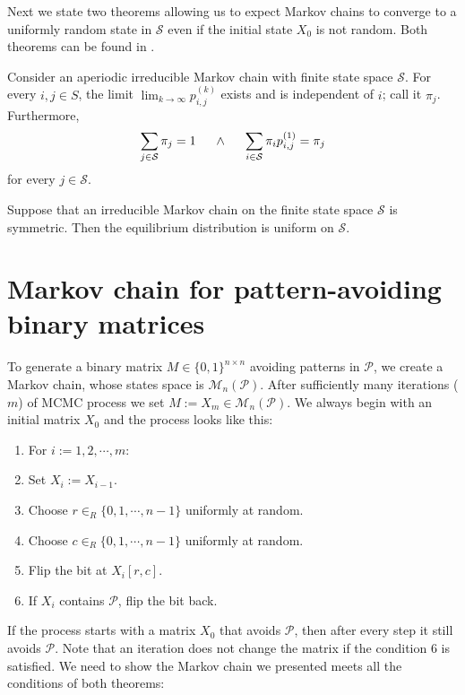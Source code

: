 Next we state two theorems allowing us to expect Markov chains to converge to a uniformly random state in $\mathcal{S}$ even if the initial state $X_0$ is not random. Both theorems can be found in \cite{Madras}.
\begin{thm}
Consider an aperiodic irreducible Markov chain with finite state space $\mathcal{S}$. For every $i,j\in S$, the limit $\lim_{k\rightarrow\infty}p_{i,j}^{(k)}$ exists and is independent of $i$; call it $\pi_j$. Furthermore, $$\sum\limits_{j\in\mathcal{S}}\pi_j=1\hspace{5mm}\wedge\hspace{5mm}\sum\limits_{i\in\mathcal{S}}\pi_ip_{i,j}^{(1)}=\pi_j$$
for every $j\in\mathcal{S}$.
\end{thm}
\begin{thm}
Suppose that an irreducible Markov chain on the finite state space $\mathcal{S}$ is symmetric. Then the equilibrium distribution is uniform on $\mathcal{S}$.
\end{thm}

\section{Markov chain for pattern-avoiding binary matrices}
\label{sect:mmcmc}
To generate a binary matrix $M\in\{0,1\}^{n\times n}$ avoiding patterns in $\mathcal{P}$, we create a Markov chain, whose states space is $\mathcal{M}_n(\mathcal{P})$. After sufficiently many iterations ($m$) of MCMC process we set $M:=X_m\in\mathcal{M}_n(\mathcal{P})$. We always begin with an initial matrix $X_0$ and the process looks like this:
\begin{enumerate}
\item For $i:=1,2,\cdots,m$:
\item \hspace{5mm} Set $X_{i}:=X_{i-1}$.
\item \hspace{5mm} Choose $r\in_R\{0,1,\cdots,n-1\}$ uniformly at random.
\item \hspace{5mm} Choose $c\in_R\{0,1,\cdots,n-1\}$ uniformly at random.
\item \hspace{5mm} Flip the bit at $X_{i}[r,c]$.
\item \hspace{5mm} If $X_{i}$ contains $\mathcal{P}$, flip the bit back.
\end{enumerate}

If the process starts with a matrix $X_0$ that avoids $\mathcal{P}$, then after every step it still avoids $\mathcal{P}$. Note that an iteration does not change the matrix if the condition 6 is satisfied. We need to show the Markov chain we presented meets all the conditions of both theorems:
